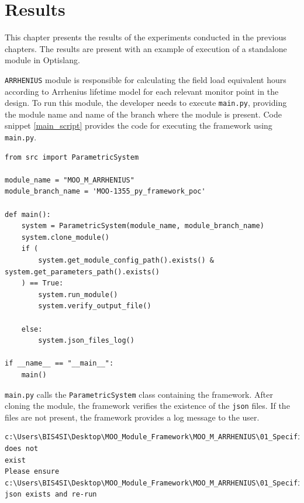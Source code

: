 \chapter{Results} \label{results}

This chapter presents the results of the experiments conducted in the previous chapters. The results are present with an example of execution of a standalone 
module in Optislang.  

\texttt{ARRHENIUS} module is responsible for calculating the field load equivalent hours according to Arrhenius lifetime model for each relevant monitor point
in the design. To run this module, the developer needs to execute \texttt{main.py}, providing the module name and name of the branch where the module is present.
Code snippet \ref{main_script} provides the code for executing the framework using \texttt{main.py}.

\renewcommand{\lstlistingname}{Code}
\begin{lstlisting}[style=pythoncode, caption={Execution of framework using \texttt{main.py}}, label={main_script}]
from src import ParametricSystem

module_name = "MOO_M_ARRHENIUS"
module_branch_name = 'MOO-1355_py_framework_poc'

def main():
    system = ParametricSystem(module_name, module_branch_name)
    system.clone_module()
    if (
        system.get_module_config_path().exists() & system.get_parameters_path().exists()
    ) == True:
        system.run_module()
        system.verify_output_file()

    else:
        system.json_files_log()

if __name__ == "__main__":
    main()
\end{lstlisting}

\texttt{main.py} calls the \texttt{ParametricSystem} class containing the framework. After cloning the module, the framework verifies the existence of the 
\texttt{\acrshort{json}} files. If the files are not present, the framework provides a log message to the user.

\renewcommand{\lstlistingname}{Code}
\begin{lstlisting}[style=terminal, caption=Error message when \acrshort{json} files are not present, label={json_files_log}]
c:\Users\BIS4SI\Desktop\MOO_Module_Framework\MOO_M_ARRHENIUS\01_Specification\module_config.json does not 
exist 
Please ensure c:\Users\BIS4SI\Desktop\MOO_Module_Framework\MOO_M_ARRHENIUS\01_Specification\module_config.
json exists and re-run
\end{lstlisting}

